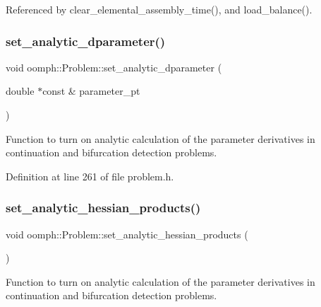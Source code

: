 Referenced by clear\+\_\+elemental\+\_\+assembly\+\_\+time(), and load\+\_\+balance().

\mbox{\label{classoomph_1_1Problem_aecef49e98bbcede9b8c3137592c2cc5a}} 
\subsubsection{\texorpdfstring{set\+\_\+analytic\+\_\+dparameter()}{set\_analytic\_dparameter()}}
{\footnotesize\ttfamily void oomph\+::\+Problem\+::set\+\_\+analytic\+\_\+dparameter (\begin{DoxyParamCaption}\item[{double $\ast$const \&}]{parameter\+\_\+pt }\end{DoxyParamCaption})\hspace{0.3cm}{\ttfamily [inline]}}



Function to turn on analytic calculation of the parameter derivatives in continuation and bifurcation detection problems. 



Definition at line 261 of file problem.\+h.

\mbox{\label{classoomph_1_1Problem_a45f64c33501e0f9c65927eefed253eef}} 
\subsubsection{\texorpdfstring{set\+\_\+analytic\+\_\+hessian\+\_\+products()}{set\_analytic\_hessian\_products()}}
{\footnotesize\ttfamily void oomph\+::\+Problem\+::set\+\_\+analytic\+\_\+hessian\+\_\+products (\begin{DoxyParamCaption}{ }\end{DoxyParamCaption})\hspace{0.3cm}{\ttfamily [inline]}}



Function to turn on analytic calculation of the parameter derivatives in continuation and bifurcation detection problems. 



